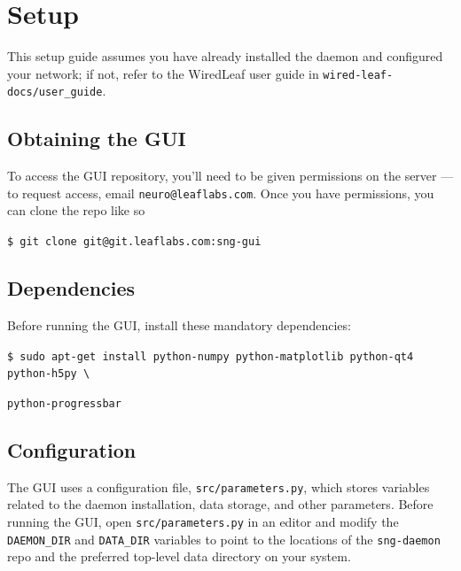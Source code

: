 
\section{Setup}
\label{sec_setup}

This setup guide assumes you have already installed the daemon and configured your network; if not, refer to the WiredLeaf user guide in \texttt{wired-leaf-docs/user\_guide}.

\subsection{Obtaining the GUI}
\label{sec_setup_obtaining}

To access the GUI repository, you'll need to be given permissions on the server --- to request access, email \texttt{neuro@leaflabs.com}. Once you have permissions, you can clone the repo like so

\vspace{5mm}
\texttt{\$ git clone git@git.leaflabs.com:sng-gui}
\vspace{5mm}

\subsection{Dependencies}
\label{sec_setup_deps}

Before running the GUI, install these mandatory dependencies:

\vspace{5mm}
\texttt{\$ sudo apt-get install python-numpy python-matplotlib python-qt4 python-h5py \textbackslash}

\hspace*{20mm}\texttt{python-progressbar}
\vspace{5mm}

\subsection{Configuration}
\label{sec_setup_config}

The GUI uses a configuration file, \texttt{src/parameters.py}, which stores variables related to the daemon installation, data storage, and other parameters. Before running the GUI, open \texttt{src/parameters.py} in an editor and modify the \texttt{DAEMON\_DIR} and \texttt{DATA\_DIR} variables to point to the locations of the \texttt{sng-daemon} repo and the preferred top-level data directory on your system.

